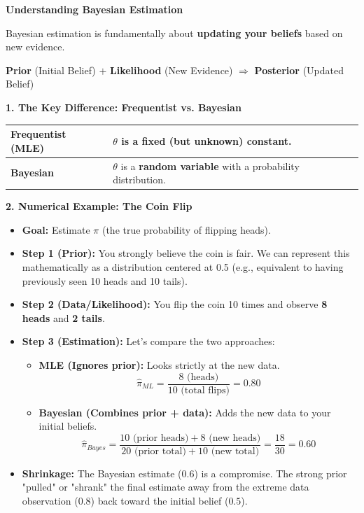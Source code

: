 \vspace{0.2cm}
\begin{example}{\textbf{Understanding Bayesian Estimation}}

Bayesian estimation is fundamentally about \textbf{updating your beliefs} based on new evidence.
\begin{center}
\textbf{Prior} (Initial Belief) $+$ \textbf{Likelihood} (New Evidence) $\Longrightarrow$ \textbf{Posterior} (Updated Belief)
\end{center}

\vspace{0.3cm}
\textbf{1. The Key Difference: Frequentist vs. Bayesian}
\begin{center}
\renewcommand{\arraystretch}{1.3}
\begin{tabular}{|l|l|}
\hline
\textbf{Frequentist (MLE)} & $\theta$ is a \textbf{fixed} (but unknown) constant. \\
\hline
\textbf{Bayesian} & $\theta$ is a \textbf{random variable} with a probability distribution. \\
\hline
\end{tabular}
\end{center}

\vspace{0.3cm}
\textbf{2. Numerical Example: The Coin Flip}
\begin{itemize}
    \item \textbf{Goal:} Estimate $\pi$ (the true probability of flipping heads).
    \item \textbf{Step 1 (Prior):} You strongly believe the coin is fair. We can represent this mathematically as a distribution centered at 0.5 (e.g., equivalent to having previously seen 10 heads and 10 tails).
    \item \textbf{Step 2 (Data/Likelihood):} You flip the coin 10 times and observe \textbf{8 heads} and \textbf{2 tails}.
    \item \textbf{Step 3 (Estimation):} Let's compare the two approaches:
    \begin{itemize}
        \item \textbf{MLE (Ignores prior):} Looks strictly at the new data.
        $$\hat{\pi}_{ML} = \frac{8 \text{ (heads)}}{10 \text{ (total flips)}} = 0.80$$
        
        \item \textbf{Bayesian (Combines prior + data):} Adds the new data to your initial beliefs.
        $$\hat{\pi}_{Bayes} = \frac{10 \text{ (prior heads)} + 8 \text{ (new heads)}}{20 \text{ (prior total)} + 10 \text{ (new total)}} = \frac{18}{30} = 0.60$$
    \end{itemize}
    \item \textbf{Shrinkage:} The Bayesian estimate ($0.6$) is a compromise. The strong prior "pulled" or "shrank" the final estimate away from the extreme data observation ($0.8$) back toward the initial belief ($0.5$).
\end{itemize}


\end{example}

